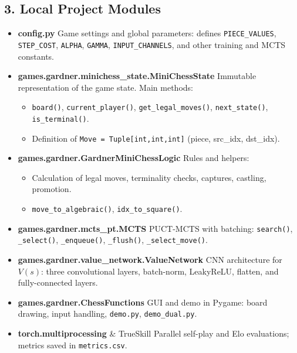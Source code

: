 \documentclass{report}
\begin{document}
\subsection*{3. Local Project Modules}
\begin{itemize}
  \item \textbf{config.py}  
    Game settings and global parameters: defines \texttt{PIECE\_VALUES}, \texttt{STEP\_COST}, \texttt{ALPHA}, \texttt{GAMMA}, \texttt{INPUT\_CHANNELS}, and other training and MCTS constants.

  \item \textbf{games.gardner.minichess\_state.MiniChessState}  
    Immutable representation of the game state. Main methods:
    \begin{itemize}
      \item \texttt{board()}, \texttt{current\_player()}, \texttt{get\_legal\_moves()}, \texttt{next\_state()}, \texttt{is\_terminal()}.
      \item Definition of \texttt{Move = Tuple[int,int,int]} (piece, src\_idx, dst\_idx).
    \end{itemize}

  \item \textbf{games.gardner.GardnerMiniChessLogic}  
    Rules and helpers:
    \begin{itemize}
      \item Calculation of legal moves, terminality checks, captures, castling, promotion.
      \item \texttt{move\_to\_algebraic()}, \texttt{idx\_to\_square()}.
    \end{itemize}

  \item \textbf{games.gardner.mcts\_pt.MCTS}  
    PUCT-MCTS with batching: \texttt{search()}, \texttt{\_select()}, \texttt{\_enqueue()}, \texttt{\_flush()}, \texttt{\_select\_move()}.

  \item \textbf{games.gardner.value\_network.ValueNetwork}  
    CNN architecture for $V(s)$: three convolutional layers, batch-norm, LeakyReLU, flatten, and fully-connected layers.

  \item \textbf{games.gardner.ChessFunctions}  
    GUI and demo in Pygame: board drawing, input handling, \texttt{demo.py}, \texttt{demo\_dual.py}.

  \item \textbf{torch.multiprocessing} \& TrueSkill  
    Parallel self-play and Elo evaluations; metrics saved in \texttt{metrics.csv}.
\end{itemize}
\end{document}
